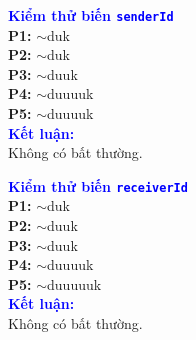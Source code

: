 \documentclass[11pt,a4paper]{article}
\begin{document}
\noindent
\begin{minipage}[t]{0.485\textwidth}
\begin{tcolorbox}[colback=white, colframe=darkblue!35, boxrule=0.6pt, arc=2pt, left=4pt, right=4pt, top=4pt, bottom=4pt]
\begin{minipage}[t]{0.41\linewidth}
\scriptsize
\textbf{\textcolor{blue}{Kiểm thử biến \texttt{senderId}}}\\[4pt]
\textbf{P1:} $\sim$duk\\
\textbf{P2:} $\sim$duk\\
\textbf{P3:} $\sim$duuk\\
\textbf{P4:} $\sim$duuuuk\\
\textbf{P5:} $\sim$duuuuk\\[6pt]
\textbf{\textcolor{blue}{Kết luận:}}\\
Không có bất thường.
\end{minipage}\hfill
\begin{minipage}[t]{0.57\linewidth}
\centering
\def\lblStart{d(s)}%
\def\lblFone{u(s)}%
\def\lblFtwo{}%
\def\lblFthree{}%
\def\lblFfour{}%
\def\lblFfive{}%
\def\lblFsix{}%
\def\lblFseven{}%
\def\lblFeight{u(s)}%
\def\lblFnine{}%
\def\lblFten{}%
\def\lblFeleven{u(s)}%
\def\lblFtwelve{}%
\def\lblFthirteen{u(s)}%
\def\lblFfourteen{}%
\resizebox{\linewidth}{!}{\DrawFriendRequestVarDFG}
\end{minipage}
\end{tcolorbox}
\end{minipage}\hfill
\begin{minipage}[t]{0.485\textwidth}
\begin{tcolorbox}[colback=white, colframe=darkblue!35, boxrule=0.6pt, arc=2pt, left=4pt, right=4pt, top=4pt, bottom=4pt]
\begin{minipage}[t]{0.41\linewidth}
\scriptsize
\textbf{\textcolor{blue}{Kiểm thử biến \texttt{receiverId}}}\\[4pt]
\textbf{P1:} $\sim$duk\\
\textbf{P2:} $\sim$duuk\\
\textbf{P3:} $\sim$duuk\\
\textbf{P4:} $\sim$duuuuk\\
\textbf{P5:} $\sim$duuuuuk\\[6pt]
\textbf{\textcolor{blue}{Kết luận:}}\\
Không có bất thường.
\end{minipage}\hfill
\begin{minipage}[t]{0.57\linewidth}
\centering
\def\lblStart{d(r)}%
\def\lblFone{u(r)}%
\def\lblFtwo{}%
\def\lblFthree{}%
\def\lblFfour{}%
\def\lblFfive{u(r)}%
\def\lblFsix{}%
\def\lblFseven{}%
\def\lblFeight{u(r)}%
\def\lblFnine{}%
\def\lblFten{}%
\def\lblFeleven{u(r)}%
\def\lblFtwelve{}%
\def\lblFthirteen{u(r)}%
\def\lblFfourteen{}%
\resizebox{\linewidth}{!}{\DrawFriendRequestVarDFG}
\end{minipage}
\end{tcolorbox}
\end{minipage}
\end{document}
